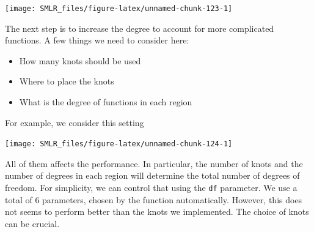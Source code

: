 \documentclass[
]{book}
\newenvironment{Shaded}{\begin{snugshade}}{\end{snugshade}}
\newcommand{\AttributeTok}[1]{\textcolor[rgb]{0.13,0.29,0.53}{#1}}
\newcommand{\DecValTok}[1]{\textcolor[rgb]{0.00,0.00,0.81}{#1}}
\newcommand{\FunctionTok}[1]{\textcolor[rgb]{0.13,0.29,0.53}{\textbf{#1}}}
\newcommand{\NormalTok}[1]{#1}
\newcommand{\OtherTok}[1]{\textcolor[rgb]{0.56,0.35,0.01}{#1}}
\newcommand{\SpecialCharTok}[1]{\textcolor[rgb]{0.81,0.36,0.00}{\textbf{#1}}}
\newcommand{\StringTok}[1]{\textcolor[rgb]{0.31,0.60,0.02}{#1}}
\providecommand{\tightlist}{%
  \setlength{\itemsep}{0pt}\setlength{\parskip}{0pt}}
\theoremstyle{definition}
\theoremstyle{definition}
\theoremstyle{definition}
\theoremstyle{definition}
\theoremstyle{remark}
\begin{document}
\begin{center}\texttt{[image: SMLR\_files/figure-latex/unnamed-chunk-123-1]} \end{center}

The next step is to increase the degree to account for more complicated functions. A few things we need to consider here:

\begin{itemize}
\tightlist
\item
  How many knots should be used
\item
  Where to place the knots
\item
  What is the degree of functions in each region
\end{itemize}

For example, we consider this setting

\begin{Shaded}
\end{Shaded}

\begin{center}\texttt{[image: SMLR\_files/figure-latex/unnamed-chunk-124-1]} \end{center}

All of them affects the performance. In particular, the number of knots and the number of degrees in each region will determine the total number of degrees of freedom. For simplicity, we can control that using the \texttt{df} parameter. We use a total of 6 parameters, chosen by the function automatically. However, this does not seems to perform better than the knots we implemented. The choice of knots can be crucial.
\end{document}
